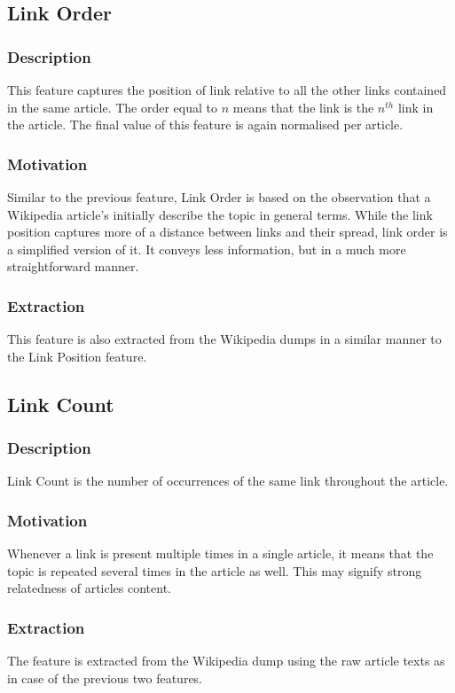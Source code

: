 \subsection{Link Order}

\subsubsection{Description}
This feature captures the position of link relative to all the other links contained in the same article. The order equal to $n$ means that the link is the $n^{th}$ link in the article. The final value of this feature is again normalised per article.

\subsubsection{Motivation}
Similar to the previous feature, Link Order is based on the observation that a Wikipedia article's initially describe the topic in general terms. While the link position captures more of a distance between links and their spread, link order is a simplified version of it. It conveys less information, but in a much more straightforward manner.

\subsubsection{Extraction}
This feature is also extracted from the Wikipedia dumps in a similar manner to the Link Position feature.

\subsection{Link Count}

\subsubsection{Description}
Link Count is the number of occurrences of the same link throughout the article.

\subsubsection{Motivation}
Whenever a link is present multiple times in a single article, it means that the topic is repeated several times in the article as well. This may signify strong relatedness of articles content.

\subsubsection{Extraction}
The feature is extracted from the Wikipedia dump using the raw article texts as in case of the previous two features.


